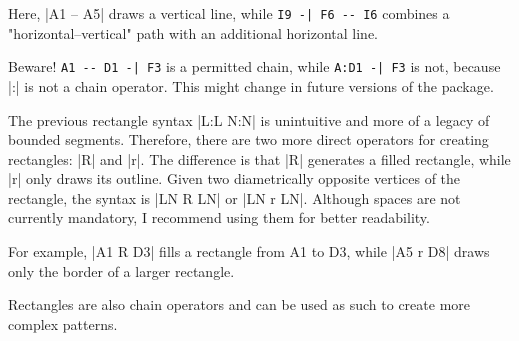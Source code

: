 \begin{goban}[9, stone = {radius = 4pt}, mark = {line = {color = red}}]
\begin{codeexample}[width=6cm]
	\begin{goban}[label = {at = all}]
	\end{goban}
\end{codeexample}

Here, |A1 -- A5| draws a vertical line, while \verb+I9 -| F6 -- I6+ combines a "horizontal--vertical" path with an additional horizontal line.

Beware! \verb+A1 -- D1 -| F3+ is a permitted chain, while \verb+A:D1 -| F3+ is not, because |:| is not a chain operator. This might change in future versions of the package.


The previous rectangle syntax |L:L N:N| is unintuitive and more of a legacy of bounded segments. Therefore, there are two more direct operators for creating rectangles: |R| and |r|. The difference is that |R| generates a filled rectangle, while |r| only draws its outline. Given two diametrically opposite vertices of the rectangle, the syntax is |LN R LN| or |LN r LN|. Although spaces are not currently mandatory, I recommend using them for better readability.

\begin{codeexample}[width=6cm]
	\begin{goban}[label = {at = all}]
	\end{goban}
\end{codeexample}

For example, |A1 R D3| fills a rectangle from A1 to D3, while |A5 r D8| draws only the border of a larger rectangle.

Rectangles are also chain operators and can be used as such to create more complex patterns.

\begin{codeexample}[width=6cm]
	\begin{goban}[label = {at = all}]
	\end{goban}
\end{codeexample}


\end{goban}
